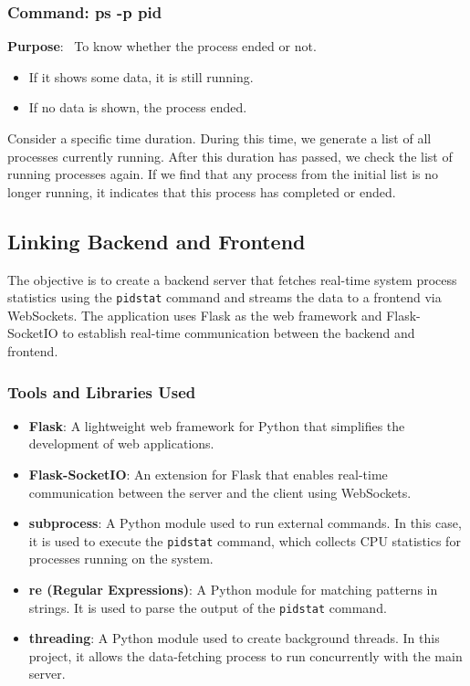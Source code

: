 \documentclass[12pt]{article}
\begin{document}
\subsubsection{Command: ps -p pid}
\textbf{Purpose}: \
To know whether the process ended or not.
 \begin{itemize}
    \item If it shows some data, it is still running.
    \item If no data is shown, the process ended.
 \end{itemize}
Consider a specific time duration. During this time, we generate a list of all processes currently running. After this duration has passed, we check the list of running processes again. If we find that any process from the initial list is no longer running, it indicates that this process has completed or ended.

\subsection{Linking Backend and Frontend}
The objective is to create a backend server that fetches real-time system process statistics using the \texttt{pidstat} command and streams the data to a frontend via WebSockets. The application uses Flask as the web framework and Flask-SocketIO to establish real-time communication between the backend and frontend.

\subsubsection{Tools and Libraries Used}

\begin{itemize}
    \item \textbf{Flask}: A lightweight web framework for Python that simplifies the development of web applications.
    \item \textbf{Flask-SocketIO}: An extension for Flask that enables real-time communication between the server and the client using WebSockets.
    \item \textbf{subprocess}: A Python module used to run external commands. In this case, it is used to execute the \texttt{pidstat} command, which collects CPU statistics for processes running on the system.
    \item \textbf{re (Regular Expressions)}: A Python module for matching patterns in strings. It is used to parse the output of the \texttt{pidstat} command.
    \item \textbf{threading}: A Python module used to create background threads. In this project, it allows the data-fetching process to run concurrently with the main server.
\end{itemize}
\end{document}
